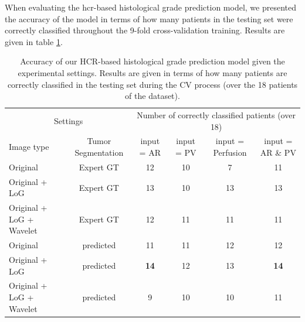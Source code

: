 When evaluating the \ac{hcr}-based histological grade prediction model, we presented the accuracy of the model in terms of how many patients in the testing set were correctly classified throughout the 9-fold cross-validation training. Results are given in table \ref{tab:hcrGrade}.
\renewcommand{\arraystretch}{2}
\begin{table}[!htp]
	\centering
	\caption{Accuracy of our HCR-based histological grade prediction model given the experimental settings. Results are given in terms of how many patients are correctly classified in the testing set during the CV process (over the 18 patients of the dataset).}\label{tab:hcrGrade}
	\scriptsize
	\begin{tabular}{lccccc}\toprule
		\multicolumn{2}{c}{Settings} &\multicolumn{4}{c}{Number of correctly classified patients (over 18)} \\\cmidrule{1-6}
		Image type &Tumor Segmentation & input = AR &input = PV &input = Perfusion & input = AR \& PV \\\midrule
		Original & Expert GT & 12  & 10  & 7 & 11 \\
		Original + LoG & Expert GT & 13  & 10  & 13 & 13 \\
		Original + LoG + Wavelet & Expert GT & 12  & 11  & 11 & 11 \\
		Original & predicted & 11  & 11  & 12 & 12 \\
		Original + LoG & predicted & \textbf{14}  & 12  & 13 & \textbf{14} \\
		Original + LoG + Wavelet & predicted & 9  & 10  & 10 & 11 \\
		\bottomrule
	\end{tabular}
\end{table}
\renewcommand{\arraystretch}{5}


